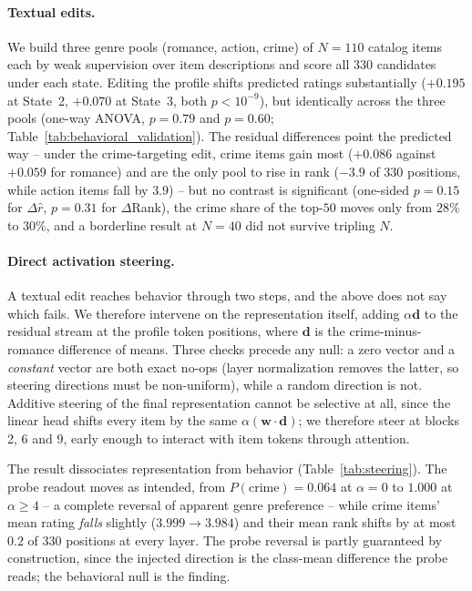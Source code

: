 \paragraph{Textual edits.}
We build three genre pools (romance, action, crime) of $N{=}110$ catalog items each by weak supervision over item descriptions and score all $330$ candidates under each state. Editing the profile shifts predicted ratings substantially ($+0.195$ at State~2, $+0.070$ at State~3, both $p<10^{-9}$), but identically across the three pools (one-way ANOVA, $p{=}0.79$ and $p{=}0.60$; Table~\ref{tab:behavioral_validation}). The residual differences point the predicted way -- under the crime-targeting edit, crime items gain most ($+0.086$ against $+0.059$ for romance) and are the only pool to rise in rank ($-3.9$ of $330$ positions, while action items fall by $3.9$) -- but no contrast is significant (one-sided $p{=}0.15$ for $\Delta\hat{r}$, $p{=}0.31$ for $\Delta$Rank), the crime share of the top-$50$ moves only from $28\%$ to $30\%$, and a borderline result at $N{=}40$ did not survive tripling $N$.

\paragraph{Direct activation steering.}
A textual edit reaches behavior through two steps, and the above does not say which fails. We therefore intervene on the representation itself, adding $\alpha\mathbf{d}$ to the residual stream at the profile token positions, where $\mathbf{d}$ is the crime-minus-romance difference of means. Three checks precede any null: a zero vector and a \emph{constant} vector are both exact no-ops (layer normalization removes the latter, so steering directions must be non-uniform), while a random direction is not. Additive steering of the final representation cannot be selective at all, since the linear head shifts every item by the same $\alpha(\mathbf{w}\cdot\mathbf{d})$; we therefore steer at blocks 2, 6 and 9, early enough to interact with item tokens through attention.

The result dissociates representation from behavior (Table~\ref{tab:steering}). The probe readout moves as intended, from $P(\text{crime}){=}0.064$ at $\alpha{=}0$ to $1.000$ at $\alpha{\geq}4$ -- a complete reversal of apparent genre preference -- while crime items' mean rating \emph{falls} slightly ($3.999 \rightarrow 3.984$) and their mean rank shifts by at most $0.2$ of $330$ positions at every layer. The probe reversal is partly guaranteed by construction, since the injected direction is the class-mean difference the probe reads; the behavioral null is the finding.

